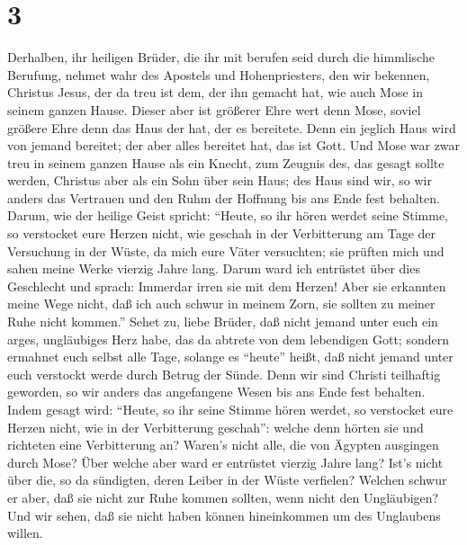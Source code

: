 \hypertarget{section-2}{%
\section{3}\label{section-2}}

 Derhalben, ihr heiligen Brüder, die ihr mit berufen seid
durch die himmlische Berufung, nehmet wahr des Apostels und
Hohenpriesters, den wir bekennen, Christus Jesus,  der da
treu ist dem, der ihn gemacht hat, wie auch Mose in seinem ganzen Hause.
 Dieser aber ist größerer Ehre wert denn Mose, soviel
größere Ehre denn das Haus der hat, der es bereitete.  Denn
ein jeglich Haus wird von jemand bereitet; der aber alles bereitet hat,
das ist Gott.  Und Mose war zwar treu in seinem ganzen Hause
als ein Knecht, zum Zeugnis des, das gesagt sollte werden, 
Christus aber als ein Sohn über sein Haus; des Haus sind wir, so wir
anders das Vertrauen und den Ruhm der Hoffnung bis ans Ende fest
behalten.  Darum, wie der heilige Geist spricht: ``Heute, so
ihr hören werdet seine Stimme,  so verstocket eure Herzen
nicht, wie geschah in der Verbitterung am Tage der Versuchung in der
Wüste,  da mich eure Väter versuchten; sie prüften mich und
sahen meine Werke vierzig Jahre lang.  Darum ward ich
entrüstet über dies Geschlecht und sprach: Immerdar irren sie mit dem
Herzen! Aber sie erkannten meine Wege nicht,  daß ich auch
schwur in meinem Zorn, sie sollten zu meiner Ruhe nicht kommen.''
 Sehet zu, liebe Brüder, daß nicht jemand unter euch ein
arges, ungläubiges Herz habe, das da abtrete von dem lebendigen Gott;
 sondern ermahnet euch selbst alle Tage, solange es
``heute'' heißt, daß nicht jemand unter euch verstockt werde durch
Betrug der Sünde.  Denn wir sind Christi teilhaftig
geworden, so wir anders das angefangene Wesen bis ans Ende fest
behalten.  Indem gesagt wird: ``Heute, so ihr seine Stimme
hören werdet, so verstocket eure Herzen nicht, wie in der Verbitterung
geschah'':  welche denn hörten sie und richteten eine
Verbitterung an? Waren's nicht alle, die von Ägypten ausgingen durch
Mose?  Über welche aber ward er entrüstet vierzig Jahre
lang? Ist's nicht über die, so da sündigten, deren Leiber in der Wüste
verfielen?  Welchen schwur er aber, daß sie nicht zur Ruhe
kommen sollten, wenn nicht den Ungläubigen?  Und wir sehen,
daß sie nicht haben können hineinkommen um des Unglaubens willen.

